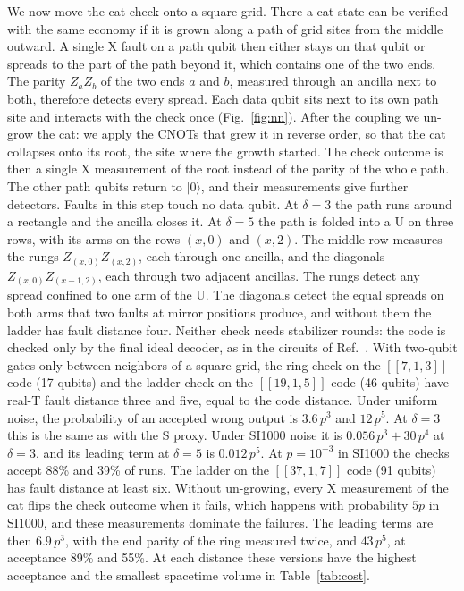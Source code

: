 \documentclass[aps,prl,reprint,twocolumn,amsmath,amssymb,floatfix,nofootinbib,superscriptaddress]{revtex4-2}
\theoremstyle{definition}
\theoremstyle{remark}
\begin{document}
We now move the cat check onto a square grid. There a cat state can be verified with the same economy if it is grown along a path of grid sites from the middle outward. A single X fault on a path qubit then either stays on that qubit or spreads to the part of the path beyond it, which contains one of the two ends. The parity $Z_aZ_b$ of the two ends $a$ and $b$, measured through an ancilla next to both, therefore detects every spread. Each data qubit sits next to its own path site and interacts with the check once (Fig.~\ref{fig:nn}). After the coupling we un-grow the cat: we apply the CNOTs that grew it in reverse order, so that the cat collapses onto its root, the site where the growth started. The check outcome is then a single X measurement of the root instead of the parity of the whole path. The other path qubits return to $|0\rangle$, and their measurements give further detectors. Faults in this step touch no data qubit. At $\delta=3$ the path runs around a rectangle and the ancilla closes it. At $\delta=5$ the path is folded into a U on three rows, with its arms on the rows $(x,0)$ and $(x,2)$. The middle row measures the rungs $Z_{(x,0)}Z_{(x,2)}$, each through one ancilla, and the diagonals $Z_{(x,0)}Z_{(x-1,2)}$, each through two adjacent ancillas. The rungs detect any spread confined to one arm of the U. The diagonals detect the equal spreads on both arms that two faults at mirror positions produce, and without them the ladder has fault distance four. Neither check needs stabilizer rounds: the code is checked only by the final ideal decoder, as in the circuits of Ref.~\cite{cultivation}.
With two-qubit gates only between neighbors of a square grid, the ring check on the $[[7,1,3]]$ code (17 qubits) and the ladder check on the $[[19,1,5]]$ code (46 qubits) have real-T fault distance three and five, equal to the code distance. Under uniform noise, the probability of an accepted wrong output is $3.6\,p^3$ and $12\,p^5$. At $\delta=3$ this is the same as with the S proxy. Under SI1000 noise it is $0.056\,p^3+30\,p^4$ at $\delta=3$, and its leading term at $\delta=5$ is $0.012\,p^5$. At $p=10^{-3}$ in SI1000 the checks accept 88\% and 39\% of runs. The ladder on the $[[37,1,7]]$ code (91 qubits) has fault distance at least six.
Without un-growing, every X measurement of the cat flips the check outcome when it fails, which happens with probability $5p$ in SI1000, and these measurements dominate the failures. The leading terms are then $6.9\,p^3$, with the end parity of the ring measured twice, and $43\,p^5$, at acceptance 89\% and 55\%. At each distance these versions have the highest acceptance and the smallest spacetime volume in Table~\ref{tab:cost}.
\end{document}
